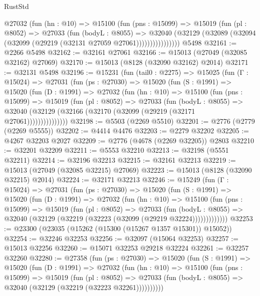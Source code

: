 \begin{lexlean}{RustStd}
\begin{coremodule}
              @27032
                (fun (hn : @10) =>
                @15100
                  (fun (pns : @15099) =>
                  @15019
                    (fun (pl : @8052) =>
                    @27033
                      (fun (bodyL : @8055) =>
                      @32040
                        (@32129
                          (@32089 (@32094 (@32099 (@29219 (@32131 @27059 @27061))))))))))))))))
    @5498
@32161 := @2266 @5498
@32162 := @32161 @27061
@32166 := @15013 (@27049 (@32085 @32162) @27069)
@32170 := @15013 (@8128 (@32090 @32162) @2014)
@32171 := @32131 @5498
@32196 := @15231
    (fun (tail0 : @2275) =>
    @15025
      (fun (Γ : @15024) =>
      @27031
        (fun (ps : @27030) =>
        @15020
          (fun (S : @1991) =>
          @15020
            (fun (D : @1991) =>
            @27032
              (fun (hn : @10) =>
              @15100
                (fun (pns : @15099) =>
                @15019
                  (fun (pl : @8052) =>
                  @27033
                    (fun (bodyL : @8055) =>
                    @32040 (@32129 (@32166 (@32170 (@32099 (@29219 (@32171 @27061)))))))))))))))
@32198 := @5503 (@2269 @5510)
@32201 := @2776 (@2779 (@2269 @5555))
@32202 := @4414 @4476
@32203 := @2279 @32202
@32205 := @4267 @32203 @2027
@32209 := @2776 (@4678 (@2269 @32205)) @2803
@32210 := @32201 @32209
@32211 := @5553 @32210
@32213 := @32198 (@5551 @32211)
@32214 := @32196 @32213
@32215 := @32161 @32213
@32219 := @15013 (@27049 (@32085 @32215) @27069)
@32223 := @15013 (@8128 (@32090 @32215) @2014)
@32224 := @32171 @32213
@32246 := @15249
    (fun (Γ : @15024) =>
    @27031
      (fun (ps : @27030) =>
      @15020
        (fun (S : @1991) =>
        @15020
          (fun (D : @1991) =>
          @27032
            (fun (hn : @10) =>
            @15100
              (fun (pns : @15099) =>
              @15019
                (fun (pl : @8052) =>
                @27033
                  (fun (bodyL : @8055) =>
                  @32040 (@32129 (@32219 (@32223 (@32099 (@29219 @32224)))))))))))))
@32253 := @23300 (@23035 (@15262 (@15300 (@15267 @1357 @15301)) @15052))
@32254 := @32246 @32253
@32256 := @32097 (@15064 @32253)
@32257 := @15013 @32256
@32260 := @15071 @32253 @29218 @32224
@32261 := @32257 @32260
@32280 := @27358
    (fun (ps : @27030) =>
    @15020
      (fun (S : @1991) =>
      @15020
        (fun (D : @1991) =>
        @27032
          (fun (hn : @10) =>
          @15100
            (fun (pns : @15099) =>
            @15019
              (fun (pl : @8052) =>
              @27033 (fun (bodyL : @8055) => @32040 (@32129 (@32219 (@32223 @32261))))))))))

\end{coremodule}
\end{lexlean}
